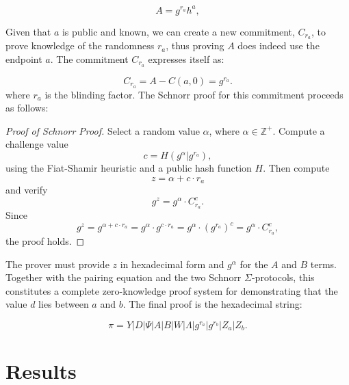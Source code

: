 \documentclass[version=preprint]{iacrcc}
\begin{document}
\begin{equation}
A = g^{r_{a}} h^{a},
\end{equation}

Given that \( a \) is public and known, we can create a new commitment, \( C_{r_a} \), to prove knowledge of the randomness \( r_a \), thus proving $A$ does indeed use the endpoint \(a\). The commitment \( C_{r_a} \) expresses itself as:

\begin{equation}
C_{r_a} = A - C(a, 0) = g^{r_{a}}.
\end{equation}
where \( r_{a} \) is the blinding factor. The Schnorr proof for this commitment proceeds as follows:

\begin{proof}[Proof of Schnorr Proof]
Select a random value \( \alpha \), where \( \alpha \in \mathbb{Z}^+ \). Compute a challenge value
\begin{equation}
c = H(g^{\alpha} | g^{r_{a}}), 
\end{equation}
using the Fiat-Shamir heuristic and a public hash function \( H \). Then compute 
\begin{equation}
z = \alpha + c \cdot r_{a}
\end{equation}
and verify
\begin{equation}
g^{z} = g^{\alpha} \cdot C_{r_a}^{c}.
\end{equation}
Since 
\begin{equation}
g^{z} = g^{\alpha + c \cdot r_{a}} = g^{\alpha} \cdot g^{c \cdot r_{a}} = g^{\alpha} \cdot (g^{r_{a}})^{c} = g^{\alpha} \cdot C_{r_a}^{c},
\end{equation}
the proof holds.
\end{proof}

The prover must provide \( z \) in hexadecimal form and \( g^{\alpha} \) for the \( A \) and \( B \) terms. Together with the pairing equation and the two Schnorr $\Sigma$-protocols, this constitutes a complete zero-knowledge proof system for demonstrating that the value \( d \) lies between \( a \) and \( b \). The final proof is the hexadecimal string:

\begin{equation}
\pi = Y | D | \Psi | A | B | W | \Lambda | g^{r_{a}} | g^{r_{b}} | Z_{a} | Z_{b}.
\end{equation}

\section{Results}
\end{document}
